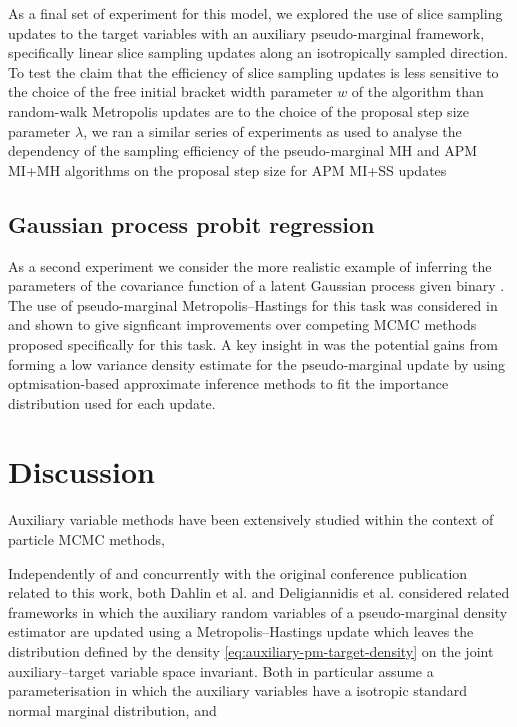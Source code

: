 As a final set of experiment for this model, we explored the use of slice sampling updates to the target variables with an auxiliary pseudo-marginal framework, specifically linear slice sampling updates along an isotropically sampled direction. To test the claim that the efficiency of slice sampling updates is less sensitive to the choice of the free initial bracket width parameter $w$ of the algorithm than random-walk Metropolis updates are to the choice of the proposal step size parameter $\lambda$, we ran a similar series of experiments as used to analyse the dependency of the sampling efficiency of the pseudo-marginal \ac{MH} and \ac{APM} \ac{MI}+\ac{MH} algorithms on the proposal step size for \ac{APM} \ac{MI}+\ac{SS} updates 

\subsection{Gaussian process probit regression}\label{subsec:pm-gaussian-process-classifier-exp}

As a second experiment we consider the more realistic example of inferring the parameters of the covariance function of a latent Gaussian process given binary . The use of pseudo-marginal Metropolis--Hastings for this task was considered in \citep{filippone2014pseudo} and shown to give signficant improvements over competing \ac{MCMC} methods proposed specifically for this task. A key insight in \citep{filippone2014pseudo} was the potential gains from forming a low variance density estimate for the pseudo-marginal update by using optmisation-based approximate inference methods to fit the importance distribution used for each update.

\section{Discussion}


Auxiliary variable methods have been extensively studied within the context of particle \ac{MCMC} methods, 

Independently of and concurrently with the original conference publication related to this work, both Dahlin et al. \citep{dahlin2015accelerating} and Deligiannidis et al. \citep{deligiannidis2015correlated} considered related frameworks in which the auxiliary random variables of a pseudo-marginal density estimator are updated using a Metropolis--Hastings update which leaves the distribution defined by the density \eqref{eq:auxiliary-pm-target-density} on the joint auxiliary--target variable space invariant. Both in particular assume a parameterisation in which the auxiliary variables have a isotropic standard normal marginal distribution, and

